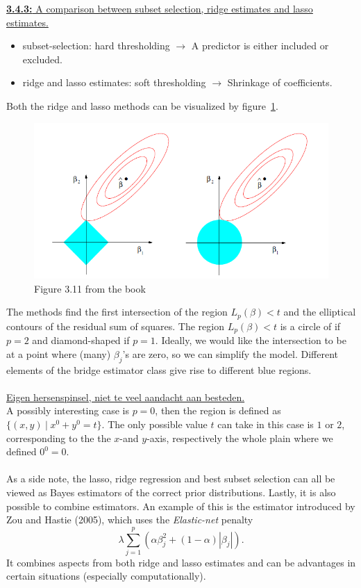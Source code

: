 \underline{\textbf{3.4.3:} A comparison between subset selection, ridge estimates and lasso estimates.}
\begin{itemize}
    \item subset-selection: hard thresholding $\rightarrow$ A predictor is either included or excluded.
    \item ridge and lasso estimates: soft thresholding $\rightarrow$ Shrinkage of coefficients.
\end{itemize}
Both the ridge and lasso methods can be visualized by figure~\ref{fig:Fig3.11}.
\begin{figure}[h!]
    \centering
    \includegraphics[width=\linewidth]{Figures/Figure3.11.PNG}
    \caption{Figure 3.11 from the book}
    \label{fig:Fig3.11}
\end{figure}
The methods find the first intersection of the region $L_p(\beta) < t$ and the elliptical contours of the residual sum of squares. The region $L_p(\beta) < t$ is a circle of if $p=2$ and diamond-shaped if $p=1$. Ideally, we would like the intersection to be at a point where (many) $\beta_j$'s are zero, so we can simplify the model. Different elements of the bridge estimator class give rise to different blue regions.\\
\\
\underline{Eigen hersenspinsel, niet te veel aandacht aan besteden.}\\
A possibly interesting case is $p=0$, then the region is defined as $\{(x,y) \hspace{3pt} | \hspace{3pt} x^0 + y^0 = t\}$. The only possible value $t$ can take in this case is $1$ or $2$, corresponding to the the $x$-and $y$-axis, respectively the whole plain where we defined $0^0=0$.\\
\\
As a side note, the lasso, ridge regression and best subset selection can all be viewed as Bayes estimators of the correct prior distributions. Lastly, it is also possible to combine estimators. An example of this is the estimator introduced by Zou and Hastie (2005), which uses the \textit{Elastic-net} penalty \begin{equation*}
    \lambda\sum_{j=1}^p (\alpha\beta_j^2+(1-\alpha)|\beta_j|).
\end{equation*} It combines aspects from both ridge and lasso estimates and can be advantages in certain situations (especially computationally).\\

